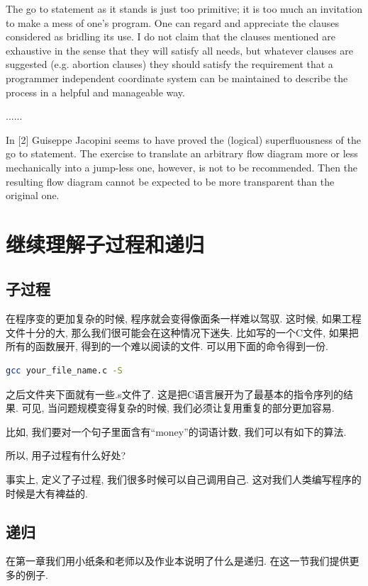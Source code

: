 \begin{pas}
The go to statement as it stands is just too primitive; it is too much an invitation to make a mess of one's program. One can regard and appreciate the clauses considered as bridling its use. I do not claim that the clauses mentioned are exhaustive in the sense that they will satisfy all needs, but whatever clauses are suggested (e.g. abortion clauses) they should satisfy the requirement that a programmer independent coordinate system can be maintained to describe the process in a helpful and manageable way.

......

In [2] Guiseppe Jacopini seems to have proved the (logical) superfluousness of the go to statement. The exercise to translate an arbitrary flow diagram more or less mechanically into a jump-less one, however, is not to be recommended. Then the resulting flow diagram cannot be expected to be more transparent than the original one.


	
\end{pas}
 
\section{继续理解子过程和递归}

\subsection*{子过程}

在程序变的更加复杂的时候, 程序就会变得像面条一样难以驾驭. 这时候, 如果工程文件十分的大, 那么我们很可能会在这种情况下迷失. 比如写的一个C文件, 如果把所有的函数展开, 得到的一个难以阅读的文件. 可以用下面的命令得到一份. 

\begin{lstlisting}[language=sh]
	gcc your_file_name.c -S
\end{lstlisting}

之后文件夹下面就有一些.s文件了. 这是把C语言展开为了最基本的指令序列的结果. 可见, 当问题规模变得复杂的时候, 我们必须让复用重复的部分更加容易. 

比如, 我们要对一个句子里面含有``money''的词语计数, 我们可以有如下的算法. 


\begin{bonus}
	所以, 用子过程有什么好处? 
\end{bonus}

事实上, 定义了子过程, 我们很多时候可以自己调用自己. 这对我们人类编写程序的时候是大有裨益的. 


\subsection*{递归}

在第一章我们用小纸条和老师以及作业本说明了什么是递归. 在这一节我们提供更多的例子. 


\begin{prob}[Hanoi塔问题]
 
\end{prob}

















